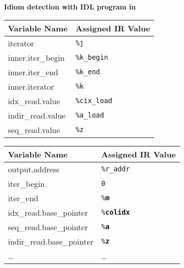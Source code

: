 \centering
\vspace{0.0em}
{\centering
\begin{minipage}{0.05\linewidth}
\vspace{0pt}
\centering
{}
\end{minipage}
\begin{minipage}{\linewidth}
\centering
\textbf{Idiom detection with IDL program in }
\end{minipage}
\begin{minipage}{0.05\linewidth}
\vspace{0pt}
\centering
{}
\end{minipage}
}

{\centering
\footnotesize 
\begin{tabular}{l|l}
\textbf{Variable Name} & \textbf{Assigned IR Value}\\
\hline
iterator                    & {\tt\%j}\\
inner.iter\_begin           & {\tt\%k\_begin}\\
inner.iter\_end             & {\tt\%k\_end}\\
inner.iterator              & {\tt\%k}\\
idx\_read.value             & {\tt\%cix\_load}\\
indir\_read.value           & {\tt\%a\_load}\\
seq\_read.value             & {\tt\%z}\\
\end{tabular}
\hspace{0.5cm}
\begin{tabular}{l|l}
\textbf{Variable Name} & \textbf{Assigned IR Value}\\
\hline
output.address              & {\tt\%r\_addr}\\
iter\_begin                 & {\tt0}\\
iter\_end                   & {\tt\%\bf m}\\
idx\_read.base\_pointer     & {\tt\%\bf colidx}\\
seq\_read.base\_pointer     & {\tt\%\bf a}\\
indir\_read.base\_pointer   & {\tt\%\bf z}\\
\dots                       & \dots\vspace{-0.5mm}\\
\end{tabular}

}

